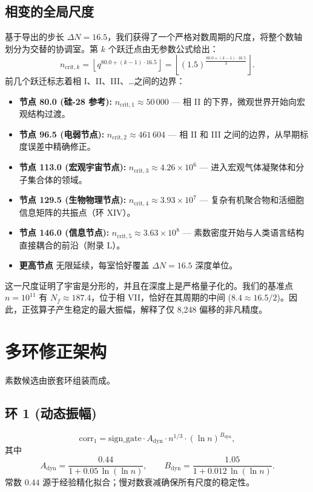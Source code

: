 \documentclass[11pt,a4paper]{article}
\begin{document}
	\subsection{相变的全局尺度}
	基于导出的步长 \(\Delta N = 16.5\)，我们获得了一个严格对数周期的尺度，将整个数轴划分为交替的协调室。第 \(k\) 个跃迁点由无参数公式给出：
	\begin{equation}
		n_{\mathrm{crit},k} = \left\lfloor q^{80.0 + (k-1)\cdot 16.5} \right\rfloor 
		= \left\lfloor (1.5)^{\frac{80.0+(k-1)\cdot 16.5}{3}} \right\rfloor .
	\end{equation}
	前几个跃迁标志着相 I、II、III、\dots 之间的边界：
	\begin{itemize}
		\item \textbf{节点 80.0 (硅-28 参考):} \(n_{\mathrm{crit},1} \approx 50\,000\) — 相 II 的下界，微观世界开始向宏观结构过渡。
		\item \textbf{节点 96.5 (电弱节点):} \(n_{\mathrm{crit},2} \approx 461\,604\) — 相 II 和 III 之间的边界，从早期标度误差中精确修正。
		\item \textbf{节点 113.0 (宏观宇宙节点):} \(n_{\mathrm{crit},3} \approx 4.26\times10^6\) — 进入宏观气体凝聚体和分子集合体的领域。
		\item \textbf{节点 129.5 (生物物理节点):} \(n_{\mathrm{crit},4} \approx 3.93\times10^7\) — 复杂有机聚合物和活细胞信息矩阵的共振点（环 XIV）。
		\item \textbf{节点 146.0 (信息节点):} \(n_{\mathrm{crit},5} \approx 3.63\times10^8\) — 素数密度开始与人类语言结构直接耦合的前沿（附录 L）。
		\item \textbf{更高节点} 无限延续，每室恰好覆盖 \(\Delta N = 16.5\) 深度单位。
	\end{itemize}
	
	这一尺度证明了宇宙是分形的，并且在深度上是严格量子化的。我们的基准点 \(n=10^{11}\) 有 \(N_f \approx 187.4\)，位于相 VII，恰好在其周期的中间 (\(8.4 \approx 16.5/2\))。因此，正弦算子产生稳定的最大振幅，解释了仅 8,248 偏移的非凡精度。
	
	\section{多环修正架构}
	\label{sec:multiloop}
	素数候选由嵌套环组装而成。
	
	\subsection{环 1 (动态振幅)}
	\[
	\mathrm{corr}_1 = \mathrm{sign\_gate} \cdot A_{\mathrm{dyn}} \cdot n^{1/3} \cdot (\ln n)^{B_{\mathrm{dyn}}},
	\]
	其中
	\[
	A_{\mathrm{dyn}} = \frac{0.44}{1 + 0.05\,\ln(\ln n)}, \qquad
	B_{\mathrm{dyn}} = \frac{1.05}{1 + 0.012\,\ln(\ln n)}.
	\]
	常数 \(0.44\) 源于经验精化拟合；慢对数衰减确保所有尺度的稳定性。
	
\end{document}
